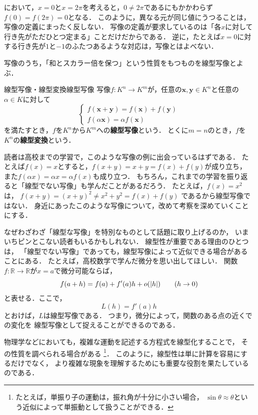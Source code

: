 において，$x = 0$と$x = 2\pi$を考えると，$0 \ne 2\pi$であるにもかかわらず$f(0) = f(2\pi) = 0$となる．
このように，異なる元が同じ値にうつることは，写像の定義にまったく反しない．
写像の定義が要求しているのは「各$x$に対して行き先がただひとつ定まる」ことだけだからである．
逆に，たとえば$x = 0$に対する行き先が$1$と$-1$のふたつあるような対応は，写像とはよべない．

写像のうち，「和とスカラー倍を保つ」という性質をもつものを線型写像とよぶ．

\begin{definition}{線型写像・線型変換}{線型写像}
  写像$f \colon K^n \to K^m$が，任意の$\bm{x}, \bm{y} \in K^n$と任意の$\alpha \in K$に対して
  \[
    \begin{cases}
      f(\bm{x} + \bm{y}) = f(\bm{x}) + f(\bm{y}) \\
      f(\alpha\bm{x}) = \alpha f(\bm{x})
    \end{cases}
  \]
  を満たすとき，$f$を$K^n$から$K^m$への\textbf{線型写像}という．
  とくに$m = n$のとき，$f$を$K^n$の\textbf{線型変換}という．
\end{definition}

読者は高校までの学習で，このような写像の例に出会っているはずである．
たとえば$f(x) = x$とすると，$f(x + y) = x + y = f(x) + f(y)$が成り立ち，
また$f(\alpha x) = \alpha x = \alpha f(x)$も成り立つ．
もちろん，これまでの学習を振り返ると「線型でない写像」も学んだことがあるだろう．
たとえば，$f(x) = x^2$は，
$f(x + y) = (x + y)^2 \ne x^2 + y^2 = f(x) + f(y)$
であるから線型写像ではない．
身近にあったこのような写像について，改めて考察を深めていくことにする．

\begin{mycolumn}
なぜわざわざ「線型な写像」を特別なものとして話題に取り上げるのか，
いまいちピンとこない読者もいるかもしれない．
線型性が重要である理由のひとつは，
「線型でない写像」であっても，線型写像によって近似できる場合があることにある．
たとえば，高校数学で学んだ微分を思い出してほしい．
関数$f \colon \mathbb{R} \to \mathbb{R}$が$x=a$で微分可能ならば，
\[
  f(a+h)=f(a)+f'(a)h+o(\lvert h\rvert)
  \qquad(h\to0)
\]
と表せる．ここで，
\[
  L(h)=f'(a)h
\]
とおけば，$L$は線型写像である．
つまり，微分によって，関数のある点の近くでの変化を
線型写像として捉えることができるのである．

物理学などにおいても，複雑な運動を記述する方程式を線型化することで，
その性質を調べられる場合がある%
\footnote{たとえば，単振り子の運動は，振れ角が十分に小さい場合，
$\sin\theta \approx \theta$という近似によって単振動として扱うことができる．}．
このように，線型性は単に計算を容易にするだけでなく，
より複雑な現象を理解するためにも重要な役割を果たしているのである．
\end{mycolumn}

